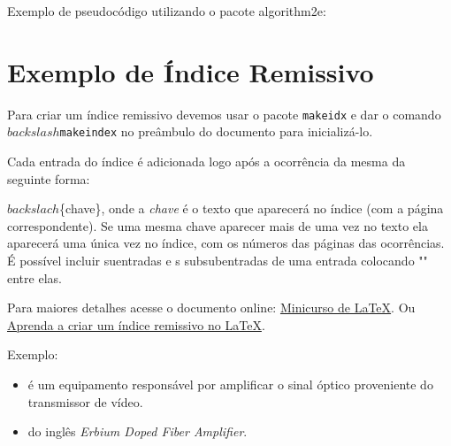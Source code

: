 \newpage

Exemplo de pseudocódigo utilizando o pacote {\color{red}algorithm2e}:



\newpage
\section{Exemplo de Índice Remissivo}
Para criar um índice remissivo devemos usar o pacote \texttt{makeidx} e dar o comando
\texttt{$backslash$makeindex} no preâmbulo do documento para inicializá-lo.

Cada entrada do índice é adicionada logo após a ocorrência da mesma da seguinte forma:

$backslach$\{chave\}, onde a \textit{chave} é o texto que aparecerá no índice (com a página correspondente). Se uma mesma chave aparecer mais de uma vez no texto ela aparecerá uma única vez no índice, com os números das páginas das ocorrências. É possível incluir suentradas e s subsubentradas de uma entrada colocando "\!" entre elas.

Para maiores detalhes acesse o documento online: \hyperlink{https://www.ime.usp.br/~viviane/MAP2212/minicurso.pdf}{Minicurso de \LaTeX{}}.
Ou \hyperlink{https://netsgo.wordpress.com/2010/09/28/aprenda-a-criar-um-indice-remissivo-no-latex-learning-how-to-create-an-index-with-latex/}{Aprenda a criar um índice remissivo no \LaTeX{}}.

Exemplo:
\begin{itemize}
    \item {} é um equipamento responsável por amplificar o sinal óptico proveniente do transmissor de vídeo.
    \item {} do inglês \textit{Erbium Doped Fiber Amplifier}.
\end{itemize}